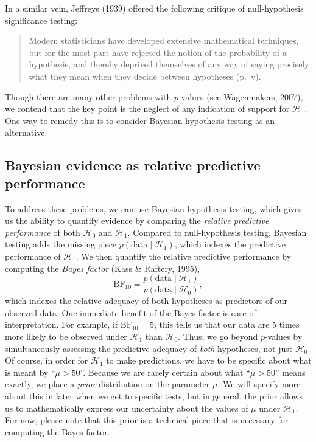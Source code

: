 \documentclass[english,,doc,floatsintext]{apa6}
\begin{document}
In a similar vein, Jeffreys (1939) offered the following critique of null-hypothesis significance testing:

\begin{quote}
Modern statisticians have developed extensive mathematical techniques, but for the most part have rejected the notion of the probability of a hypothesis, and thereby deprived themselves of any way of saying precisely what they mean when they decide between hypotheses (p.~v).
\end{quote}

Though there are many other problems with \(p\)-values (see Wagenmakers, 2007), we contend that the key point is the neglect of any indication of support for \(\mathcal{H}_1\). One way to remedy this is to consider Bayesian hypothesis testing as an alternative.

\hypertarget{bayesian-evidence-as-relative-predictive-performance}{%
\subsection{Bayesian evidence as relative predictive performance}\label{bayesian-evidence-as-relative-predictive-performance}}

To address these problems, we can use Bayesian hypothesis testing, which gives us the ability to quantify evidence by comparing the \emph{relative predictive performance} of both \(\mathcal{H}_0\) and \(\mathcal{H}_1\). Compared to null-hypothesis testing, Bayesian testing adds the missing piece \(p(\text{data}\mid \mathcal{H}_1)\), which indexes the predictive performance of \(\mathcal{H}_1\). We then quantify the relative predictive performance by computing the \emph{Bayes factor} (Kass \& Raftery, 1995),
\[
\text{BF}_{10} = \frac{p(\text{data}\mid\mathcal{H}_1)}{p(\text{data}\mid\mathcal{H}_0)},
\]
which indexes the relative adequacy of both hypotheses as predictors of our observed data. One immediate benefit of the Bayes factor is ease of interpretation. For example, if \(\text{BF}_{10}=5\), this tells us that our data are 5 times more likely to be observed under \(\mathcal{H}_1\) than \(\mathcal{H}_0\). Thus, we go beyond \(p\)-values by simultaneously assessing the predictive adequacy of \emph{both} hypotheses, not just \(\mathcal{H}_0\). Of course, in order for \(\mathcal{H}_1\) to make predictions, we have to be specific about what is meant by \enquote{\(\mu > 50\)}. Because we are rarely certain about what \enquote{\(\mu > 50\)} means exactly, we place a \emph{prior} distribution on the parameter \(\mu\). We will specify more about this in later when we get to specific tests, but in general, the prior allows us to mathematically express our uncertainty about the values of \(\mu\) under \(\mathcal{H}_1\). For now, please note that this prior is a technical piece that is necessary for computing the Bayes factor.
\end{document}

